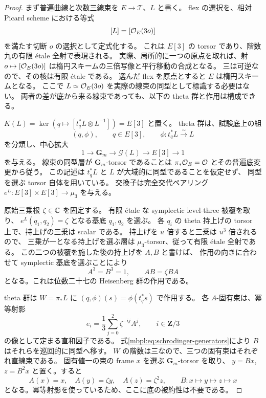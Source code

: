 \begin{proof}
まず普遍曲線と次数三線束を $E\to\mathcal T$、$L$ と書く。
flex の選択を、相対 Picard scheme における等式
\[
 [L]=[\mathcal O_E(3o)]
\]
を満たす切断 $o$ の選択として定式化する。
これは $E[3]$ の torsor であり、階数九の有限 \'etale 全射で表現される。
実際、局所的に一つの原点を取れば、射
$o\mapsto[\mathcal O_E(3o)]$ は楕円スキームの三倍写像と平行移動の合成となる。
三は可逆なので、その核は有限 \'etale である。
選んだ flex を原点とすると $E$ は楕円スキームとなる。
ここで $L\simeq\mathcal O_E(3o)$ を実際の線束の同型として標識する必要はない。
両者の差が底から来る線束であっても、以下の theta 群と作用は構成できる。

$K(L)=\ker(q\mapsto[t_q^*L\otimes L^{-1}])=E[3]$ と置く。
theta 群は、試験底上の組
\[
 (q,\phi),\qquad q\in E[3],\qquad \phi:t_q^*L\xrightarrow{\sim}L
\]
を分類し、中心拡大
\begin{equation}\label{mbpl:eq:relative-theta-group}
 1\longrightarrow\mathbf G_m\longrightarrow\mathcal G(L)
   \longrightarrow E[3]\longrightarrow1
\end{equation}
を与える。
線束の同型層が $\mathbf G_m$-torsor であることは
$\pi_*\mathcal O_E=\mathcal O$ とその普遍底変更から従う。
この記述は $t_q^*L$ と $L$ が大域的に同型であることを仮定せず、
同型を選ぶ torsor 自体を用いている。
交換子は完全交代ペアリング
$e^L:E[3]\times E[3]\to\mu_3$ を与える。

原始三乗根 $\zeta\in\mathbb C$ を固定する。
有限 \'etale な symplectic level-three 被覆を取り、
$e^L(q_1,q_2)=\zeta$ となる基底 $q_1,q_2$ を選ぶ。
各 $q_i$ の theta 持上げの torsor 上で、持上げの三乗は scalar である。
持上げを $u$ 倍すると三乗は $u^3$ 倍されるので、
三乗が一となる持上げを選ぶ層は $\mu_3$-torsor、従って有限 \'etale 全射である。
この二つの被覆を施した後の持上げを $A,B$ と書けば、
作用の向きに合わせて symplectic 基底を選ぶことにより
\begin{equation}\label{mbpl:eq:schrodinger-generators}
 A^3=B^3=1,\qquad AB=\zeta BA
\end{equation}
となる。これは位数二十七の Heisenberg 群の作用である。

theta 群は $W=\pi_*L$ に
$(q,\phi)(s)=\phi(t_q^*s)$ で作用する。
各 $A$-固有束は、冪等射影
\[
 e_i=\frac13\sum_{j=0}^2\zeta^{-ij}A^j,\qquad i\in\mathbf Z/3
\]
の像として定まる直和因子である。
式\eqref{mbpl:eq:schrodinger-generators}により $B$ はそれらを巡回的に同型へ移す。
$W$ の階数は三なので、三つの固有束はそれぞれ直線束である。
固有値一の束の frame $x$ を選ぶ $\mathbf G_m$-torsor を取り、
$y=Bx$, $z=B^2x$ と置く。すると
\[
 A(x)=x,\quad A(y)=\zeta y,\quad A(z)=\zeta^2z,
 \qquad B:x\mapsto y\mapsto z\mapsto x
\]
となる。冪等射影を使っているため、ここに底の被約性は不要である。


\end{proof}
